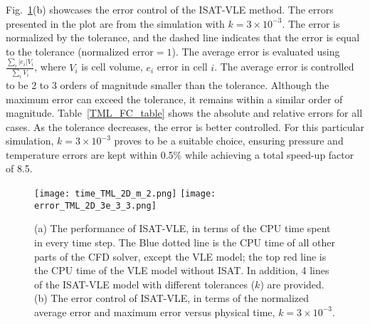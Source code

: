 Fig.~\ref{TML_PE}(b) showcases the error control of the ISAT-VLE method. The errors presented in the plot are from the simulation with $k= 3 \times 10^{-3}$. The error is normalized by the tolerance, and the dashed line indicates that the error is equal to the tolerance ($\text{normalized error}=1$). The average error is evaluated using $\frac{\sum_i |e_i|V_i}{\sum_i V_i}$, where $V_i$ is cell volume, $e_i$ error in cell $i$. The average error is controlled to be 2 to 3 orders of magnitude smaller than the tolerance. Although the maximum error can exceed the tolerance, it remains within a similar order of magnitude. Table~\ref{TML_FC_table} shows the absolute and relative errors for all cases. As the tolerance decreases, the error is better controlled. For this particular simulation, $k= 3 \times 10^{-3}$ proves to be a suitable choice, ensuring pressure and temperature errors are kept within 0.5\% while achieving a total speed-up factor of 8.5.



\begin{figure}[htbp]
\centering
\texttt{[image: time\_TML\_2D\_m\_2.png]}
\texttt{[image: error\_TML\_2D\_3e\_3\_3.png]}
\caption{(a) The performance of ISAT-VLE, in terms of the CPU time spent in every time step. The Blue dotted line is the CPU time of all other parts of the CFD solver, except the VLE model; the top red line is the CPU time of the VLE model without ISAT. In addition, 4 lines of the ISAT-VLE model with different tolerances ($k$) are provided. (b) The error control of ISAT-VLE, in terms of the normalized average error and maximum error versus physical time, $k=3\times 10^{-3}$.}
\label{TML_PE} 
\end{figure}



